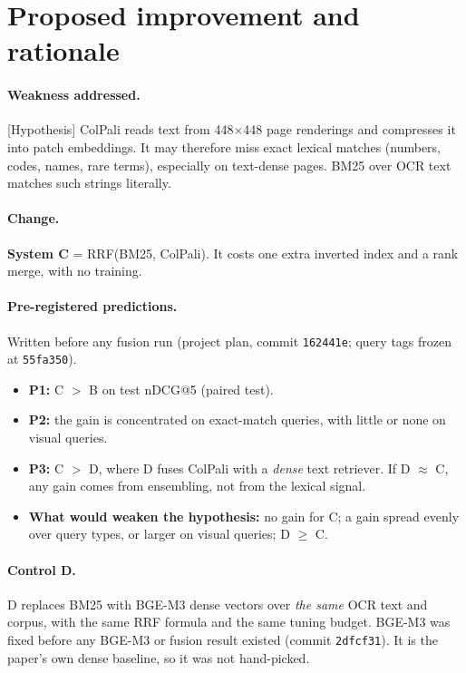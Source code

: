 \documentclass[11pt,a4paper]{article}
\newcommand{\lbl}[2]{\textsf{\scriptsize\textcolor{#1}{[#2]}}}
\newcommand{\Hyp}{\lbl{tagH}{Hypothesis}}
\begin{document}
\section{Proposed improvement and rationale}
\label{sec:improve}

\paragraph{Weakness addressed.}
\Hyp{} ColPali reads text from 448$\times$448 page renderings and compresses it into patch embeddings. It may therefore miss exact lexical matches (numbers, codes, names, rare terms), especially on text-dense pages. BM25 over OCR text matches such strings literally.

\paragraph{Change.}
\textbf{System C} = RRF(BM25, ColPali). It costs one extra inverted index and a rank merge, with no training.

\paragraph{Pre-registered predictions.} Written before any fusion run (project plan, commit \texttt{162441e}; query tags frozen at \texttt{55fa350}).
\begin{itemize}
  \item \textbf{P1:} C $>$ B on test nDCG@5 (paired test).
  \item \textbf{P2:} the gain is concentrated on exact-match queries, with little or none on visual queries.
  \item \textbf{P3:} C $>$ D, where D fuses ColPali with a \emph{dense} text retriever. If D $\approx$ C, any gain comes from ensembling, not from the lexical signal.
  \item \textbf{What would weaken the hypothesis:} no gain for C; a gain spread evenly over query types, or larger on visual queries; D $\geq$ C.
\end{itemize}

\paragraph{Control D.}
D replaces BM25 with BGE-M3 dense vectors over \emph{the same} OCR text and corpus, with the same RRF formula and the same tuning budget. BGE-M3 was fixed before any BGE-M3 or fusion result existed (commit \texttt{2dfcf31}). It is the paper's own dense baseline, so it was not hand-picked.
\end{document}
